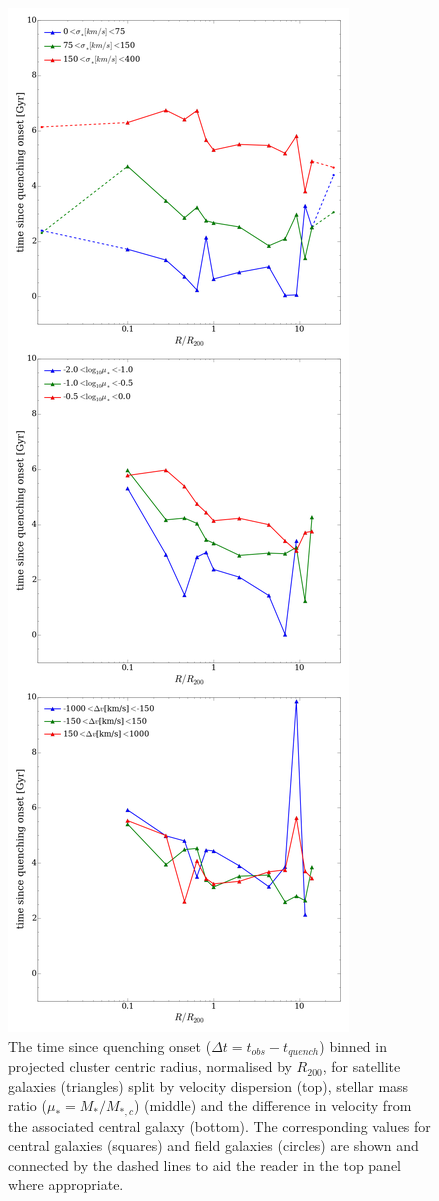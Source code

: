 \documentclass[useAMS,usenatbib]{mn2e}
\begin{document}
\begin{figure}
\includegraphics[height=0.875\textheight]{time_since_quenching_v_disp_mu_bins_delv.png}
\caption{The time since quenching onset ($\Delta t = t_{obs} - t_{quench}$) binned in projected cluster centric radius, normalised by $R_{200}$, for satellite galaxies (triangles) split by velocity dispersion (top), stellar mass ratio ($\mu_* = M_*/M_{*,c}$) (middle) and the difference in velocity from the associated central galaxy (bottom). The corresponding values for central galaxies (squares) and field galaxies (circles) are shown and connected by the dashed lines to aid the reader in the top panel where appropriate.}
\label{fig:timesinceradiusvel}
\end{figure}
\end{document}
